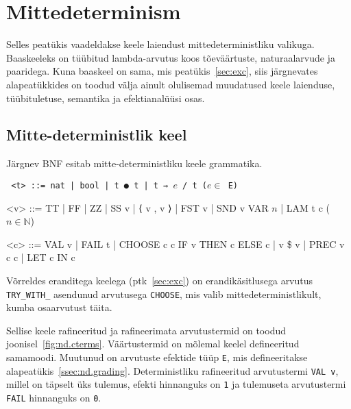 \documentclass[a4paper,12pt]{article}
\begin{document}
\clearpage\vspace*{0pt}


\section{Mittedeterminism}

Selles peatükis vaadeldakse keele laiendust mittedeterministliku valikuga.
Baaskeeleks on tüübitud lambda-arvutus koos tõeväärtuste, naturaalarvude ja paaridega.
Kuna baaskeel on sama, mis peatükis~\ref{sec:exc}, siis järgnevates alapeatükkides on toodud välja ainult olulisemad muudatused keele laienduse, tüübituletuse, semantika ja efektianalüüsi osas.


\subsection{Mitte-deterministlik keel}

Järgnev BNF esitab mitte-deterministliku keele grammatika.
\begin{adjustwidth}{1em}{0pt}
\begin{grammar}\tt
<t> ::= nat | bool | t ● t | t ⇒ $e$ / t \hfill ($e \in$ E)
  
<v> ::= TT | FF | ZZ | SS v | ⟨ v , v ⟩ | FST v | SND v
    \alt VAR $n$ | LAM t c \hfill ($n \in \mathbb N$)
  
<c> ::= VAL v | FAIL t | CHOOSE c c
    \alt IF v THEN c ELSE c | v \$ v | PREC v c c | LET c IN c
\end{grammar}
\end{adjustwidth}

Võrreldes eranditega keelega (ptk~\ref{sec:exc}) on erandikäsitlusega arvutus {\tt TRY_WITH_} asendunud arvutusega {\tt CHOOSE}, mis valib mittedeterministlikult, kumba osaarvutust täita.

Sellise keele rafineeritud ja rafineerimata arvutustermid on toodud joonisel~\ref{fig:nd.cterms}.
Väärtustermid on mõlemal keelel defineeritud samamoodi.
Muutunud on arvutuste efektide tüüp {\tt E}, mis defineeritakse alapeatükis~\ref{ssec:nd.grading}.
Deterministliku rafineeritud arvutustermi {\tt VAL v}, millel on täpselt üks tulemus, efekti hinnanguks on {\tt 1} ja tulemuseta arvutustermi {\tt FAIL} hinnanguks on {\tt 0}.
\end{document}
